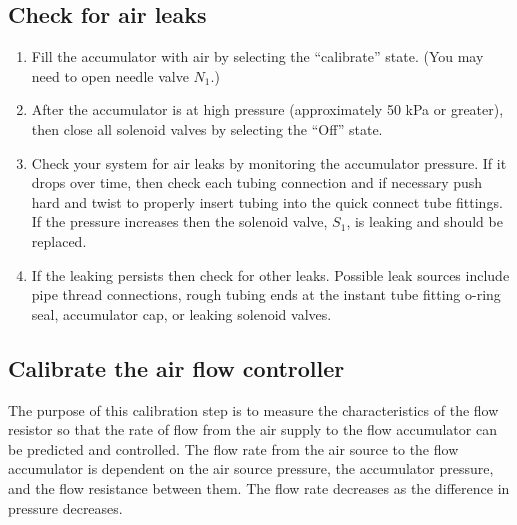 \documentclass[letterpaper,10pt,english]{sphinxmanual}
\begin{document}
\subsection{Check for air leaks}
\label{\detokenize{Gas_Transfer/Gas_Transfer:check-for-air-leaks}}\begin{enumerate}
\item {} 
Fill the accumulator with air by selecting the “calibrate” state. (You may need to open needle valve \(N_1\).)

\item {} 
After the accumulator is at high pressure (approximately 50 kPa or greater), then close all solenoid valves by selecting the “Off” state.

\item {} 
Check your system for air leaks by monitoring the accumulator pressure. If it drops over time, then check each tubing connection and if necessary push hard and twist to properly insert tubing into the quick connect tube fittings. If the pressure increases then the solenoid valve, \(S_1\), is leaking and should be replaced.

\item {} 
If the leaking persists then check for other leaks. Possible leak sources include pipe thread connections, rough tubing ends at the instant tube fitting o-ring seal, accumulator cap, or leaking solenoid valves.

\end{enumerate}


\subsection{Calibrate the air flow controller}
\label{\detokenize{Gas_Transfer/Gas_Transfer:calibrate-the-air-flow-controller}}
The purpose of this calibration step is to measure the characteristics of the flow resistor so that the rate of flow from the air supply to the flow accumulator can be predicted and controlled. The flow rate from the air source to the flow accumulator is dependent on the air source pressure, the accumulator pressure, and the flow resistance between them. The flow rate decreases as the difference in pressure decreases.
\end{document}

